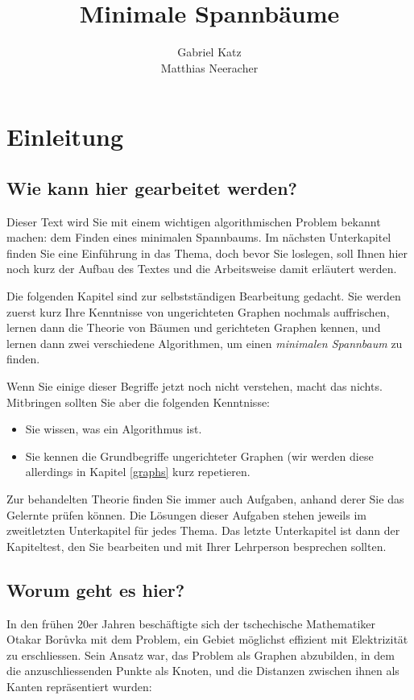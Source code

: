 \documentclass[12pt,a4paper]{report}
\title{Minimale Spannb\"{a}ume}
\author{Gabriel Katz\\ Matthias Neeracher}
\theoremstyle{break}
\begin{document}
\maketitle
\tableofcontents
\chapter{Einleitung}

\section{Wie kann hier gearbeitet werden?}

Dieser Text wird Sie mit einem wichtigen algorithmischen Problem
bekannt machen: dem Finden eines minimalen Spannbaums. Im n\"{a}chsten
Unterkapitel finden Sie eine Einf\"{u}hrung in das Thema, doch bevor
Sie loslegen, soll Ihnen hier noch kurz der Aufbau des Textes und die
Arbeitsweise damit erl\"{a}utert werden.

Die folgenden Kapitel sind zur selbstst\"{a}ndigen Bearbeitung
gedacht. Sie werden zuerst kurz Ihre Kenntnisse von ungerichteten
Graphen nochmals auffrischen, lernen dann die Theorie von B\"{a}umen
und gerichteten Graphen kennen, und lernen dann zwei verschiedene
Algorithmen, um einen \emph{minimalen Spannbaum} zu finden.
 
Wenn Sie einige dieser Begriffe jetzt noch nicht verstehen, macht das
nichts. Mitbringen sollten Sie aber die folgenden Kenntnisse:

\begin{itemize}
\item Sie wissen, was ein Algorithmus ist.
\item Sie kennen die Grundbegriffe ungerichteter Graphen (wir werden
  diese allerdings in Kapitel \ref{graphs} kurz repetieren.
\end{itemize}

Zur behandelten Theorie finden Sie immer auch Aufgaben, anhand derer
Sie das Gelernte pr\"{u}fen k\"{o}nnen. Die L\"{o}sungen dieser Aufgaben stehen
jeweils im zweitletzten Unterkapitel f\"{u}r jedes Thema. Das letzte
Unterkapitel ist dann der Kapiteltest, den Sie bearbeiten und mit
Ihrer Lehrperson besprechen sollten.

\section{Worum geht es hier?}

In den fr\"uhen 20er Jahren besch\"aftigte sich der tschechische
Mathematiker Otakar Bor\r{u}vka mit dem Problem, ein Gebiet
m\"{o}glichst effizient mit Elektrizit\"{a}t zu erschliessen. Sein
Ansatz war, das Problem als Graphen abzubilden, in dem die
anzuschliessenden Punkte als Knoten, und die Distanzen zwischen ihnen
als Kanten repr\"{a}sentiert wurden:
\end{document}
